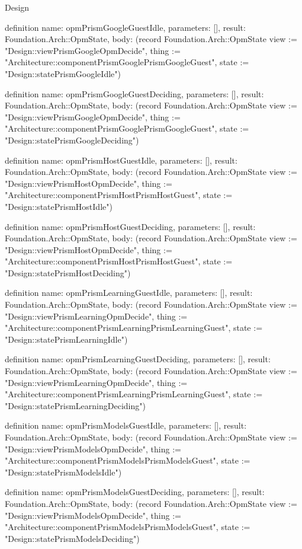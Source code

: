 \begin{lexlean}{Design}
\begin{semanticmodule}
definition{
  name: opmPrismGoogleGuestIdle,
  parameters: [],
  result: Foundation.Arch::OpmState,
  body: (record Foundation.Arch::OpmState {view := "Design::viewPrismGoogleOpmDecide", thing := "Architecture::componentPrismGooglePrismGoogleGuest", state := "Design::statePrismGoogleIdle"})
}

definition{
  name: opmPrismGoogleGuestDeciding,
  parameters: [],
  result: Foundation.Arch::OpmState,
  body: (record Foundation.Arch::OpmState {view := "Design::viewPrismGoogleOpmDecide", thing := "Architecture::componentPrismGooglePrismGoogleGuest", state := "Design::statePrismGoogleDeciding"})
}

definition{
  name: opmPrismHostGuestIdle,
  parameters: [],
  result: Foundation.Arch::OpmState,
  body: (record Foundation.Arch::OpmState {view := "Design::viewPrismHostOpmDecide", thing := "Architecture::componentPrismHostPrismHostGuest", state := "Design::statePrismHostIdle"})
}

definition{
  name: opmPrismHostGuestDeciding,
  parameters: [],
  result: Foundation.Arch::OpmState,
  body: (record Foundation.Arch::OpmState {view := "Design::viewPrismHostOpmDecide", thing := "Architecture::componentPrismHostPrismHostGuest", state := "Design::statePrismHostDeciding"})
}

definition{
  name: opmPrismLearningGuestIdle,
  parameters: [],
  result: Foundation.Arch::OpmState,
  body: (record Foundation.Arch::OpmState {view := "Design::viewPrismLearningOpmDecide", thing := "Architecture::componentPrismLearningPrismLearningGuest", state := "Design::statePrismLearningIdle"})
}

definition{
  name: opmPrismLearningGuestDeciding,
  parameters: [],
  result: Foundation.Arch::OpmState,
  body: (record Foundation.Arch::OpmState {view := "Design::viewPrismLearningOpmDecide", thing := "Architecture::componentPrismLearningPrismLearningGuest", state := "Design::statePrismLearningDeciding"})
}

definition{
  name: opmPrismModelsGuestIdle,
  parameters: [],
  result: Foundation.Arch::OpmState,
  body: (record Foundation.Arch::OpmState {view := "Design::viewPrismModelsOpmDecide", thing := "Architecture::componentPrismModelsPrismModelsGuest", state := "Design::statePrismModelsIdle"})
}

definition{
  name: opmPrismModelsGuestDeciding,
  parameters: [],
  result: Foundation.Arch::OpmState,
  body: (record Foundation.Arch::OpmState {view := "Design::viewPrismModelsOpmDecide", thing := "Architecture::componentPrismModelsPrismModelsGuest", state := "Design::statePrismModelsDeciding"})
}


\end{semanticmodule}
\end{lexlean}
